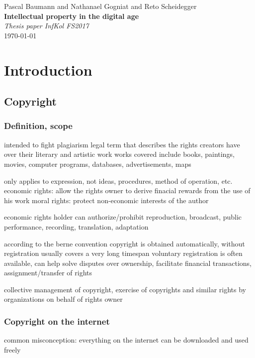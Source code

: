 \documentclass[a4paper]{report}
\newcommand*{\titleAP}{\begingroup %
	\centering
	\vspace*{\baselineskip} %
	
	{\Large Pascal Baumann} and {\Large Nathanael Gogniat} and {\Large Reto Scheidegger}\\[0.167\textheight] %
	
	{\Huge\bfseries Intellectual property in the digital age}\\[\baselineskip]
	
	{\Large \textit{Thesis paper InfKol FS2017}}\\
	\today
	
	\vspace*{3\baselineskip} %
	\endgroup}
\begin{document}
\titleAP

\begin{abstract}
	\blindtext
\end{abstract}
\newpage

\tableofcontents

\newpage

\chapter{Introduction}
\label{ch:Intro}

\section{Copyright}
\label{sec:Copyright}

\subsection{Definition, scope}
intended to fight plagiarism
legal term that describes the rights creators have over their literary and artistic work
works covered include books, paintings, movies, computer programs, databases, advertisements, maps

only applies to expression, not ideas, procedures, method of operation, etc.
economic rights: allow the rights owner to derive finacial rewards from the use of his work
moral rights: protect non-economic interests of the author

economic rights holder can authorize/prohibit
reproduction, broadcast, public performance, recording, translation, adaptation

according to the berne convention copyright is obtained automatically, without registration
usually covers a very long timespan
voluntary registration is often available, can help solve disputes over ownership, facilitate financial transactions, assignment/transfer of rights

collective management of copyright, exercise of copyrights and similar rights by organizations on behalf of rights owner

\subsection{Copyright on the internet}
common misconception: everything on the internet can be downloaded and used freely
\end{document}
